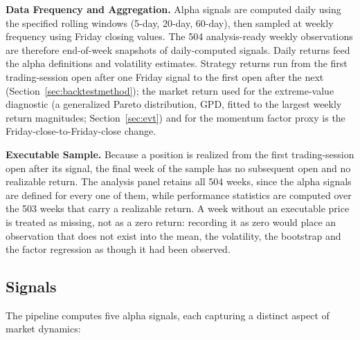\documentclass[11pt]{article}
\begin{document}
\textbf{Data Frequency and Aggregation.} Alpha signals are computed daily using the specified rolling windows (5-day, 20-day, 60-day), then sampled at weekly frequency using Friday closing values. The 504 analysis-ready weekly observations are therefore end-of-week snapshots of daily-computed signals. Daily returns feed the alpha definitions and volatility estimates. Strategy returns run from the first trading-session open after one Friday signal to the first open after the next (Section~\ref{sec:backtestmethod}); the market return used for the extreme-value diagnostic (a generalized Pareto distribution, GPD, fitted to the largest weekly return magnitudes; Section~\ref{sec:evt}) and for the momentum factor proxy is the Friday-close-to-Friday-close change.

\textbf{Executable Sample.} Because a position is realized from the first trading-session open after its signal, the final week of the sample has no subsequent open and no realizable return. The analysis panel retains all 504 weeks, since the alpha signals are defined for every one of them, while performance statistics are computed over the 503 weeks that carry a realizable return. A week without an executable price is treated as missing, not as a zero return: recording it as zero would place an observation that does not exist into the mean, the volatility, the bootstrap and the factor regression as though it had been observed.

\subsection{Signals}
\label{sec:signals}

The pipeline computes five alpha signals, each capturing a distinct aspect of market dynamics:
\end{document}
